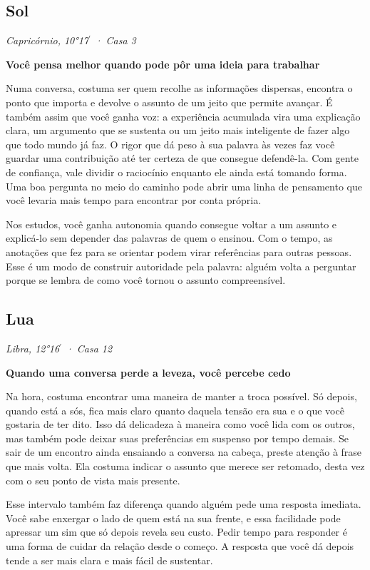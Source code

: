 \documentclass[11pt,a4paper]{article}
\newcommand{\leitura}[3]{\subsection{#1}\textit{#2}\par #3}
\newcommand{\subtituloleitura}[1]{\textbf{#1}\par\nopagebreak[4]}
\begin{document}
\leitura{Sol}{Capricórnio, 10°17\ensuremath{^{\prime}} · Casa 3}{
\label{pos-sol}\subtituloleitura{Você pensa melhor quando pode pôr uma ideia para trabalhar} Numa conversa, costuma ser quem recolhe as informações dispersas, encontra o ponto que importa e devolve o assunto de um jeito que permite avançar. É também assim que você ganha voz: a experiência acumulada vira uma explicação clara, um argumento que se sustenta ou um jeito mais inteligente de fazer algo que todo mundo já faz. O rigor que dá peso à sua palavra às vezes faz você guardar uma contribuição até ter certeza de que consegue defendê-la. Com gente de confiança, vale dividir o raciocínio enquanto ele ainda está tomando forma. Uma boa pergunta no meio do caminho pode abrir uma linha de pensamento que você levaria mais tempo para encontrar por conta própria.

Nos estudos, você ganha autonomia quando consegue voltar a um assunto e explicá-lo sem depender das palavras de quem o ensinou. Com o tempo, as anotações que fez para se orientar podem virar referências para outras pessoas. Esse é um modo de construir autoridade pela palavra: alguém volta a perguntar porque se lembra de como você tornou o assunto compreensível.
}

\leitura{Lua}{Libra, 12°16\ensuremath{^{\prime}} · Casa 12}{
\label{pos-lua}\subtituloleitura{Quando uma conversa perde a leveza, você percebe cedo} Na hora, costuma encontrar uma maneira de manter a troca possível. Só depois, quando está a sós, fica mais claro quanto daquela tensão era sua e o que você gostaria de ter dito. Isso dá delicadeza à maneira como você lida com os outros, mas também pode deixar suas preferências em suspenso por tempo demais. Se sair de um encontro ainda ensaiando a conversa na cabeça, preste atenção à frase que mais volta. Ela costuma indicar o assunto que merece ser retomado, desta vez com o seu ponto de vista mais presente.

Esse intervalo também faz diferença quando alguém pede uma resposta imediata. Você sabe enxergar o lado de quem está na sua frente, e essa facilidade pode apressar um sim que só depois revela seu custo. Pedir tempo para responder é uma forma de cuidar da relação desde o começo. A resposta que você dá depois tende a ser mais clara e mais fácil de sustentar.
}
\end{document}
